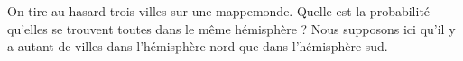 
\begin{exercice}\label{exosmath-0192}

On tire au hasard trois villes sur une mappemonde. Quelle est la probabilité qu'elles se trouvent toutes dans le même hémisphère ? Nous supposons ici qu'il y a autant de villes dans l'hémisphère nord que dans l'hémisphère sud.

\end{exercice}
